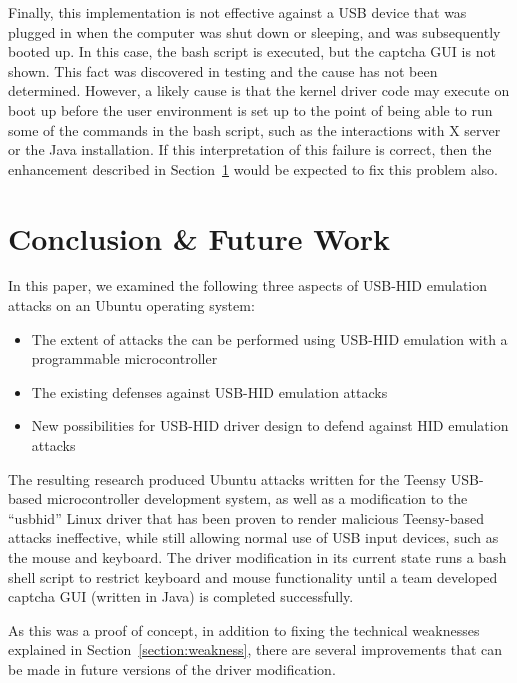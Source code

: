 \documentclass[pagenumbers]{ieee}
\begin{document}
Finally, this implementation is not effective against a USB device that was plugged in when the computer was shut down or sleeping, and was subsequently booted up.  In this case, the bash script is executed, but the captcha GUI is not shown. This fact was discovered in testing and the cause has not been determined. However, a likely cause is that the kernel driver code may execute on boot up before the user environment is set up to the point of being able to run some of the commands in the bash script, such as the interactions with X server or the Java installation. If this interpretation of this failure is correct, then the enhancement described in Section~\ref{section:conclusion} would be expected to fix this problem also.


\section{Conclusion \& Future Work}
\label{section:conclusion}

In this paper, we examined the following three aspects of USB-HID emulation attacks on an Ubuntu operating system:

\begin{itemize}
\item The extent of attacks the can be performed using USB-HID emulation with a programmable microcontroller
\item The existing defenses against USB-HID emulation attacks
\item New possibilities for USB-HID driver design to defend against HID emulation attacks
\end{itemize}

The resulting research produced Ubuntu attacks written for the Teensy USB-based microcontroller development system, as well as a modification to the ``usbhid'' Linux driver that has been proven to render malicious Teensy-based attacks ineffective, while still allowing normal use of USB input devices, such as the mouse and keyboard. The driver modification in its current state runs a bash shell script to restrict keyboard and mouse functionality until a team developed captcha GUI (written in Java) is completed successfully.

As this was a proof of concept, in addition to fixing the technical weaknesses explained in Section~\ref{section:weakness}, there are several improvements that can be made in future versions of the driver modification.
\end{document}
